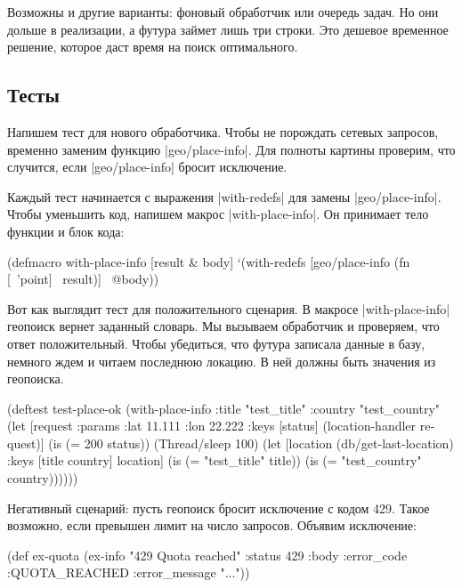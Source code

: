 Возможны и другие варианты: фоновый обработчик или очередь задач. Но они дольше
в реализации, а футура займет лишь три строки. Это дешевое временное решение,
которое даст время на поиск оптимального.

\subsection{Тесты}

Напишем тест для нового обработчика. Чтобы не порождать сетевых запросов,
временно заменим функцию \spverb|geo/place-info|. Для полноты картины проверим,
что случится, если \spverb|geo/place-info| бросит исключение.

Каждый тест начинается с выражения \spverb|with-redefs| для замены
\spverb|geo/place-info|. Чтобы уменьшить код, напишем макрос
\spverb|with-place-info|. Он принимает тело функции и блок кода:

\begin{english}
  \begin{clojure}
(defmacro with-place-info
  [result & body]
  `(with-redefs [geo/place-info
                 (fn [~'point] ~result)]
     ~@body))
  \end{clojure}
\end{english}

Вот как выглядит тест для положительного сценария. В макросе
\spverb|with-place-info| геопоиск вернет заданный словарь. Мы вызываем
обработчик и проверяем, что ответ положительный. Чтобы убедиться, что футура
записала данные в базу, немного ждем и читаем последнюю локацию. В ней должны
быть значения из геопоиска.

\begin{english}
  \begin{clojure}
(deftest test-place-ok
  (with-place-info
    {:title "test_title"
     :country "test_country"}
    (let [request {:params {:lat 11.111 :lon 22.222}}
          {:keys [status]} (location-handler request)]
      (is (= 200 status))
      (Thread/sleep 100)
      (let [location (db/get-last-location)
            {:keys [title country]} location]
        (is (= "test_title" title))
        (is (= "test_country" country))))))
  \end{clojure}
\end{english}

Негативный сценарий: пусть геопоиск бросит исключение с кодом 429. Такое
возможно, если превышен лимит на число запросов. Объявим исключение:

\begin{english}
  \begin{clojure}
(def ex-quota
  (ex-info "429 Quota reached"
           {:status 429
            :body {:error_code :QUOTA_REACHED
                   :error_message "..."}}))
  \end{clojure}
\end{english}

